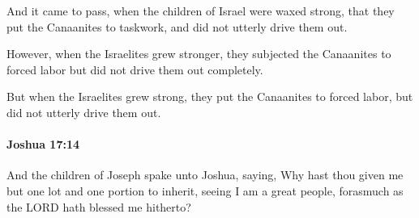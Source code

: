 			\begin{versebox}
					\item[BHS] 
					\item[ASV] And it came to pass, when the children of Israel were waxed strong, that they put the Canaanites to taskwork, and did not utterly drive them out.
					\item[NIV] However, when the Israelites grew stronger, they subjected the Canaanites to forced labor but did not drive them out completely.
					\item[NRSV] But when the Israelites grew strong, they put the Canaanites to forced labor, but did not utterly drive them out.
			\end{versebox}

		\paragraph{Joshua 17:14} %
			\label{JOSHUA-17-14}

			And the children of Joseph spake unto Joshua, saying, Why hast thou given me but one lot and one portion to inherit, seeing I am a great people, forasmuch as the LORD hath blessed me hitherto?

